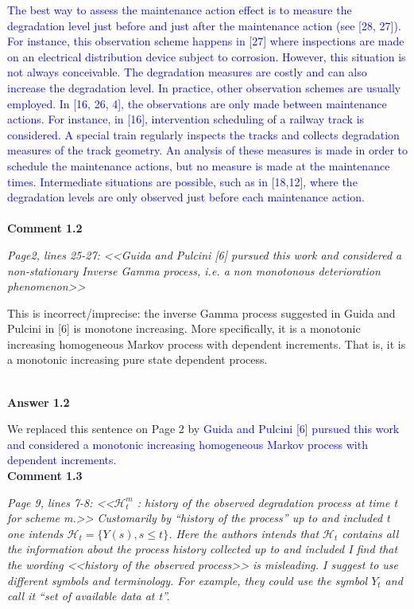 \textcolor{blue}{The best way to assess the maintenance action effect is to  measure the degradation level just before and just after the maintenance action (see [28, 27]). For instance, this observation scheme happens in [27] where inspections are made on an electrical distribution device subject to corrosion. However, this situation is not always conceivable. The degradation measures are costly and can also increase the degradation level. In practice, other observation schemes are usually employed. In [16, 26, 4], the observations are only made between maintenance actions. For instance, in [16], intervention scheduling of a railway track is considered. A special train regularly inspects the tracks and collects degradation measures of the track geometry. An analysis of these measures is made in order to schedule the maintenance actions, but no measure is made at the maintenance times.
  Intermediate situations are possible, such as in [18,12], where the degradation levels are only observed just before each maintenance action.}\\


\\

{ \bf Comment 1.2}

{\it Page2, lines 25-27: <<Guida and Pulcini [6] pursued this work and considered a non-stationary Inverse Gamma process, i.e. a non monotonous deterioration phenomenon>>

This is incorrect/imprecise: the inverse Gamma process suggested in Guida and Pulcini in [6] is monotone increasing. More specifically, it is a monotonic increasing homogeneous Markov process with dependent increments. That is, it is a monotonic increasing pure state dependent process.}\\

{  \bf Answer 1.2 }

We replaced this sentence on Page 2 by \textcolor{blue}{Guida and Pulcini [6] pursued this work and considered a monotonic increasing homogeneous Markov process with dependent increments.}\\


{ \bf Comment 1.3  }

{\it Page 9, lines 7-8: <<$\mathcal{H}_t^m$ : history of the observed degradation process at time t for scheme m.>>
Customarily by “history of the process” up to and included t one intends $\mathcal{H}_t=\{Y(s),s\leq t\}$.
Here the authors intends that $\mathcal{H}_t$
contains all the information about the process history collected up to and included
I find that the wording <<history of the observed process>> is misleading. I suggest to use different symbols and
terminology. For example, they could use the symbol $Y_t$ and call it “set of available data at t”.}\\

